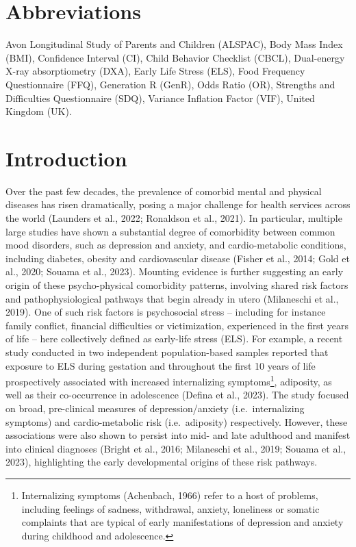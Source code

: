 \documentclass[
  letterpaper,
  DIV=11,
  numbers=noendperiod]{scrreport}
\begin{document}
\section*{Abbreviations}\label{abbreviations-1}


Avon Longitudinal Study of Parents and Children (ALSPAC), Body Mass
Index (BMI), Confidence Interval (CI), Child Behavior Checklist (CBCL),
Dual-energy X-ray absorptiometry (DXA), Early Life Stress (ELS), Food
Frequency Questionnaire (FFQ), Generation R (GenR), Odds Ratio (OR),
Strengths and Difficulties Questionnaire (SDQ), Variance Inflation
Factor (VIF), United Kingdom (UK).

\newpage

\section{Introduction}\label{introduction-1}

Over the past few decades, the prevalence of comorbid mental and
physical diseases has risen dramatically, posing a major challenge for
health services across the world (Launders et al., 2022; Ronaldson et
al., 2021). In particular, multiple large studies have shown a
substantial degree of comorbidity between common mood disorders, such as
depression and anxiety, and cardio-metabolic conditions, including
diabetes, obesity and cardiovascular disease (Fisher et al., 2014; Gold
et al., 2020; Souama et al., 2023). Mounting evidence is further
suggesting an early origin of these psycho-physical comorbidity
patterns, involving shared risk factors and pathophysiological pathways
that begin already in utero (Milaneschi et al., 2019). One of such risk
factors is psychosocial stress -- including for instance family
conflict, financial difficulties or victimization, experienced in the
first years of life -- here collectively defined as early-life stress
(ELS). For example, a recent study conducted in two independent
population-based samples reported that exposure to ELS during gestation
and throughout the first 10 years of life prospectively associated with
increased internalizing symptoms\footnote{Internalizing symptoms
  (Achenbach, 1966) refer to a host of problems, including feelings of
  sadness, withdrawal, anxiety, loneliness or somatic complaints that
  are typical of early manifestations of depression and anxiety during
  childhood and adolescence.}, adiposity, as well as their co-occurrence
in adolescence (Defina et al., 2023). The study focused on broad,
pre-clinical measures of depression/anxiety (i.e.~internalizing
symptoms) and cardio-metabolic risk (i.e.~adiposity) respectively.
However, these associations were also shown to persist into mid- and
late adulthood and manifest into clinical diagnoses (Bright et al.,
2016; Milaneschi et al., 2019; Souama et al., 2023), highlighting the
early developmental origins of these risk pathways.
\end{document}

